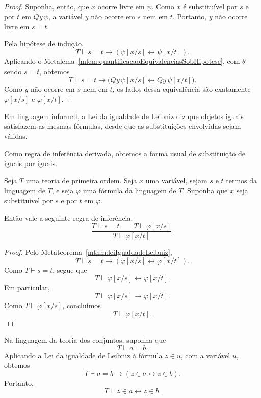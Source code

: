 \begin{proof}
    Suponha, então, que $x$ ocorre livre em $\psi$.
    Como $x$ é substituível por $s$ e por $t$ em $Qy\,\psi$, a variável $y$ não ocorre em $s$ nem em $t$.
    Portanto, $y$ não ocorre livre em $s=t$.

    Pela hipótese de indução,
    \[
        T\vdash s=t\rightarrow(\psi[x/s]\leftrightarrow\psi[x/t]).
    \]
    Aplicando o Metalema~\ref{mlem:quantificacaoEquivalenciasSobHipotese}, com $\theta$ sendo $s=t$, obtemos
    \[
        T\vdash
        s=t\rightarrow
        \bigl(Qy\,\psi[x/s]\leftrightarrow Qy\,\psi[x/t]\bigr).
    \]
    Como $y$ não ocorre em $s$ nem em $t$, os lados dessa equivalência são exatamente $\varphi[x/s]$ e $\varphi[x/t]$.
\end{proof}

Em linguagem informal, a Lei da igualdade de Leibniz diz que objetos iguais satisfazem as mesmas fórmulas, desde que as substituições envolvidas sejam válidas.

Como regra de inferência derivada, obtemos a forma usual de substituição de iguais por iguais.

\begin{metacorollary}\label{mcor:substituicaoIguaisPorIguais}
    Seja $T$ uma teoria de primeira ordem.
    Seja $x$ uma variável, sejam $s$ e $t$ termos da linguagem de $T$, e seja $\varphi$ uma fórmula da linguagem de $T$.
    Suponha que $x$ seja substituível por $s$ e por $t$ em $\varphi$.

    Então vale a seguinte regra de inferência:
    \[
        \frac{T\vdash s=t \qquad T\vdash \varphi[x/s]}
             {T\vdash \varphi[x/t]}.
    \]
\end{metacorollary}

\begin{proof}
    Pelo Metateorema~\ref{mthm:leiIgualdadeLeibniz},
    \[
        T\vdash s=t\rightarrow(\varphi[x/s]\leftrightarrow\varphi[x/t]).
    \]
    Como $T\vdash s=t$, segue que
    \[
        T\vdash \varphi[x/s]\leftrightarrow\varphi[x/t].
    \]
    Em particular,
    \[
        T\vdash \varphi[x/s]\rightarrow\varphi[x/t].
    \]
    Como $T\vdash \varphi[x/s]$, concluímos
    \[
        T\vdash \varphi[x/t].
    \]
\end{proof}

\begin{example}
    Na linguagem da teoria dos conjuntos, suponha que
    \[
        T\vdash a=b.
    \]
    Aplicando a Lei da igualdade de Leibniz à fórmula $z\in u$, com a variável $u$, obtemos
    \[
        T\vdash a=b\rightarrow(z\in a\leftrightarrow z\in b).
    \]
    Portanto,
    \[
        T\vdash z\in a\leftrightarrow z\in b.
    \]
\end{example}

